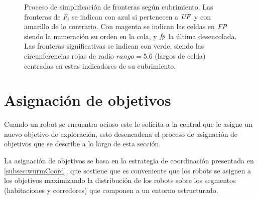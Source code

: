 \begin{figure}[H]
  \centerfloat
  \setcounter{subfigure}{6}

  \caption[Proceso de simplificación de fronteras según cubrimiento.]{Proceso
    de simplificación de fronteras según cubrimiento.  Las fronteras de
    $F_i$ se indican con azul si pertenecen a $\mathit{UF}$ y con amarillo de lo
    contrario. Con magenta se indican las celdas en $\mathit{FP}$ siendo la
  numeración su orden en la cola, y $\mathit{fp}$ la última desencolada. Las fronteras significativas se indican con
verde, siendo las circunferencias rojas de radio $rango=5.6$ (largos de celda) centradas en estas indicadores de su cubrimiento.}\label{fig:ejemploFSCub}
\end{figure}

\section{Asignación de objetivos}\label{sec:asigTar}

Cuando un robot se encuentra ocioso este le solicita a la central que le asigne
un nuevo objetivo de exploración, esto desencadena el proceso de asignación de
objetivos que se describe a lo largo de esta sección.

La asignación de objetivos se basa en la estrategia de coordinación presentada
en \ref{subsec:wurmCoord}, que sostiene que es conveniente que los robots se
asignen a los objetivos maximizando la distribución de los robots
sobre los segmentos (habitaciones y corredores) que componen a un entorno
estructurado.

